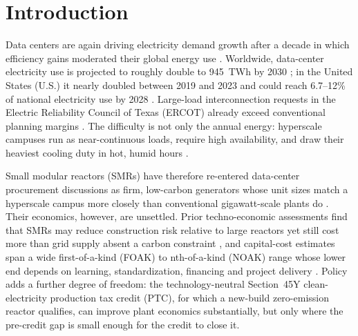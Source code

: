 \documentclass[a4paper,fleqn]{cas-sc}
\begin{document}
\section{Introduction}
\label{sec:intro}


Data centers are again driving electricity demand growth after a decade in which efficiency gains moderated their global energy use \citep{masanet2020datacenter}. Worldwide, data-center electricity use is projected to roughly double to 945~TWh by 2030 \citep{iea2024electricity,iea2025energyAi}; in the United States (U.S.) it nearly doubled between 2019 and 2023 and could reach 6.7--12\% of national electricity use by 2028 \citep{shehabi2024}. Large-load interconnection requests in the Electric Reliability Council of Texas (ERCOT) already exceed conventional planning margins \citep{ercot2025longterm,eia2026aeo}. The difficulty is not only the annual energy: hyperscale campuses run as near-continuous loads, require high availability, and draw their heaviest cooling duty in hot, humid hours \citep{greenGrid2012pue,ashrae2021thermal}.

Small modular reactors (SMRs) have therefore re-entered data-center procurement discussions as firm, low-carbon generators whose unit sizes match a hyperscale campus more closely than conventional gigawatt-scale plants do \citep{mignacca2020smrFinance,doe2024liftoff,atb2024nuclear,asuega2023}. Their economics, however, are unsettled. Prior techno-economic assessments find that SMRs may reduce construction risk relative to large reactors yet still cost more than grid supply absent a carbon constraint \citep{asuega2023}, and capital-cost estimates span a wide first-of-a-kind (FOAK) to nth-of-a-kind (NOAK) range whose lower end depends on learning, standardization, financing and project delivery \citep{inl2024metaanalysis,nea2020constructionCost,atb2024nuclear}. Policy adds a further degree of freedom: the technology-neutral Section~45Y clean-electricity production tax credit (PTC), for which a new-build zero-emission reactor qualifies, can improve plant economics substantially, but only where the pre-credit gap is small enough for the credit to close it.
\end{document}
